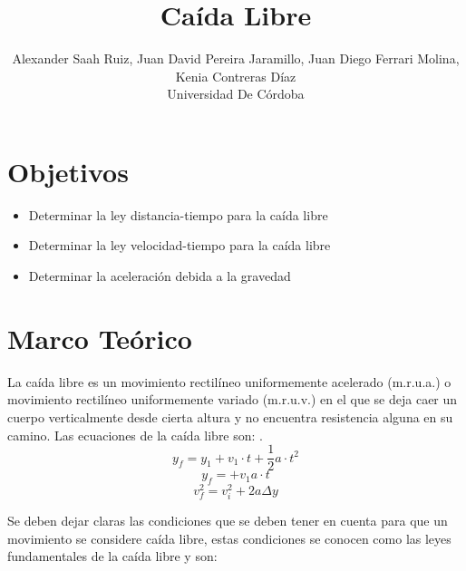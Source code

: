 \documentclass[11pt,twocolumn]{article}
\title{Caída Libre}
\author{Alexander Saah Ruiz, Juan David Pereira Jaramillo, Juan Diego Ferrari Molina, Kenia Contreras Díaz  \\ Universidad De Córdoba}
\begin{document}
\section{Objetivos}
\begin{itemize}
    \item Determinar la ley distancia-tiempo para la caída libre
    
    \item Determinar la ley velocidad-tiempo para la caída libre
    \item Determinar la aceleración debida a la gravedad
    
\end{itemize}

\section{Marco Teórico}

La caída libre es un movimiento rectilíneo uniformemente acelerado (m.r.u.a.) o movimiento rectilíneo uniformemente variado (m.r.u.v.) en el que se deja caer un cuerpo verticalmente desde cierta altura y no encuentra resistencia alguna en su camino. Las ecuaciones de la caída libre son: \cite{ref_1}.\\

$$y_{f}=y_{1}+v_{1}\cdot t+\frac{1}{2}a\cdot t^{2}$$
$$y_{f}=+v_{1}a\cdot t$$
$$v_{f}^{2}=v_{i}^{2}+2a\Delta y$$

Se deben dejar claras las condiciones que se deben tener en cuenta para que un movimiento se considere caída libre, estas condiciones se conocen como las leyes fundamentales de la caída libre y son:\cite{ref_2}\\
\end{document}
